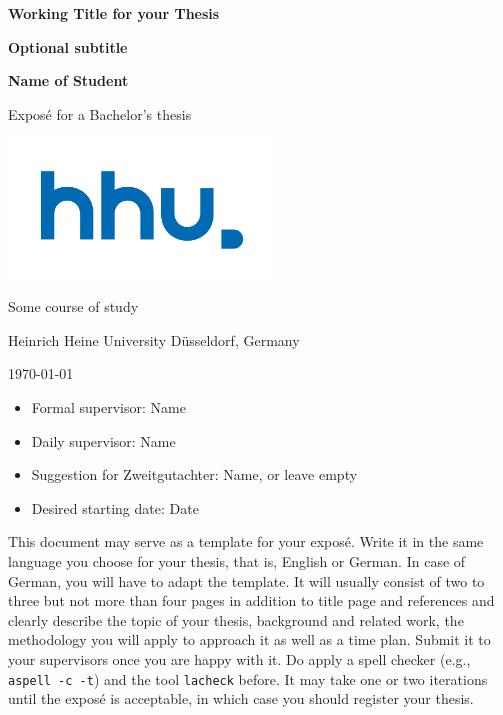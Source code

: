\documentclass[a4paper,11pt]{article}
\begin{document}
\begin{center}
    \vspace*{1cm}

    {\Huge\bfseries Working Title for your Thesis}

    {\Large\bfseries Optional subtitle}

    \vspace{1.5cm}

    {\Large\bfseries Name of Student}

    \vspace{1.5cm}

    {\Large Exposé for a Bachelor's thesis}

    \vspace{1.5cm}

    \includegraphics[width=7cm]{fig/hhu.pdf}

    \vspace{0.5cm}

    {\large
        Some course of study \par
        Heinrich Heine University Düsseldorf, Germany \par
        \today \par
    }

    \vspace{1cm}
\end{center}

\begin{itemize}[leftmargin=2cm, labelsep=0.5em, before=\large]
    \item Formal supervisor: Name
    \item Daily supervisor: Name
    \item Suggestion for Zweitgutachter: Name, or leave empty
    \item Desired starting date: Date
\end{itemize}

\vspace{2cm}

\clearpage

\pagestyle{plain}

This document may serve as a template for your exposé. Write it in the same language you choose for your thesis, that is, English or German. In case of German, you will have to adapt the template. It will usually consist of two to three but not more than four pages in addition to title page and references and clearly describe the topic of your thesis, background and related work, the methodology you will apply to approach it as well as a time plan. Submit it to your supervisors once you are happy with it. Do apply a spell checker (e.g., \texttt{aspell -c -t}) and the tool \texttt{lacheck} before. It may take one or two iterations until the exposé is acceptable, in which case you should register your thesis.
\end{document}

